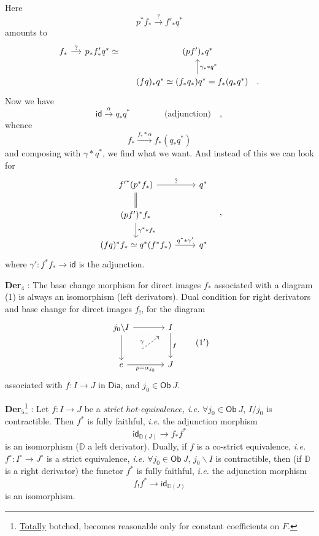 \documentclass[11pt]{article}
\newcommand{\printedpage}[1]{\marginpar{\footnotesize p.~#1}}
\newcommand{\msp}[1]{\marginpar{\footnotesize [#1]}}
\newcommand{\sDia}{\mathsf{Dia}}
\newcommand{\sOb}{\mathsf{Ob}}
\newcommand{\sid}{\mathsf{id}}
\newcommand{\DD}{\mathbb{D}}
\begin{document}
Here
\[ p^* f_* \xrightarrow{?} f'_* q^* \]
amounts to
\[
\begin{tikzcd}[column sep=small]
f_* \arrow[r, "?"] & p_* f'_* q^* \simeq & (pf')_* q^* \\
 & & (fq)_* q^* \simeq (f_* q_*) q^* = f_*(q_* q^*) \quad . \arrow[u, "\gamma_* * q^*"']
\end{tikzcd}
\]
Now we have
\[ \sid \xrightarrow{\alpha} q_* q^* \qquad\qquad \text{(adjunction)} \quad , \]
whence
\[ f_* \xrightarrow{f_* * \alpha} f_*(q_* q^*) \]
and composing with $\gamma * q^*$, we find what we want. And instead of this we can look for
\[
\begin{tikzcd}
{f'}^*(p^* f_*) \arrow[r, "?"] \arrow[d, equal] & q^* \\
(pf')^* f_* \arrow[d, "\gamma^* * f_*"] & \\
(fq)^* f_* \simeq q^*(f^* f_*) \arrow[r, "q^* * \gamma'"] & q^*
\end{tikzcd}
\quad ,
\]
where $\gamma' : f^* f_* \to \sid$ is the adjunction.

\printedpage{22}
\msp{page 32}
\textbf{Der}$_4$ : The base change morphism for direct images $f_*$ associated with a diagram (1) is always an isomorphism (left derivators). Dual condition for right derivators and base change for direct images $f_!$, for the diagram
\[
\begin{tikzcd}[row sep=large, column sep=large]
j_0 \backslash I \arrow[r] \arrow[d] & I \arrow[d, "f"] \\
e \arrow[r, "p = \alpha_{j_0}"'] & J
\arrow[from=2-1, to=1-2, dashed, shorten <=22pt, shorten >=8pt, "\gamma"]
\end{tikzcd}
\tag*{(1$'$)}
\]
associated with $f : I \to J$ in $\sDia$, and $j_0 \in \sOb\ J$.

\textbf{Der}$_5$\footnote[10]{\underline{Totally} botched, becomes reasonable only for constant coefficients on $F$.} : Let $f : I \to J$ be a \textit{strict hot-equivalence, i.e.} $\forall j_0 \in \sOb\ J$, $I/j_0$ is contractible. Then $f^*$ is fully faithful, \textit{i.e.} the adjunction morphism
\[ \sid_{\DD(J)} \longrightarrow f_* f^* \]
is an isomorphism ($\DD$ a left derivator). Dually, if $f$ is a co-strict equivalence, \textit{i.e.} $f^\circ : I^\circ \to J^\circ$ is a strict equivalence, \textit{i.e.} $\forall j_0 \in \sOb\ J$, $j_0 \backslash I$ is contractible, then (if $\DD$ is a right derivator) the functor $f^*$ is fully faithful, \textit{i.e.} the adjunction morphism %
\[ f_! f^* \longrightarrow \sid_{\DD(J)} \]
is an isomorphism.
\end{document}

